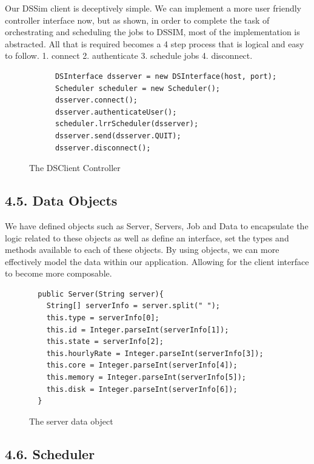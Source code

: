 \documentclass[a4paper]{article} %
\begin{document}
Our DSSim client is deceptively simple. We can implement a more user friendly controller interface now, but as shown, in order to complete the task of orchestrating and scheduling the jobs to DSSIM, most of the implementation is abstracted. All that is required becomes a 4 step process that is logical and easy to follow. 1. connect 2. authenticate 3. schedule jobs 4. disconnect.


\begin{figure}[ht!]
\begin{lstlisting}
      DSInterface dsserver = new DSInterface(host, port);
      Scheduler scheduler = new Scheduler();
      dsserver.connect();
      dsserver.authenticateUser();
      scheduler.lrrScheduler(dsserver);
      dsserver.send(dsserver.QUIT);
      dsserver.disconnect();
\end{lstlisting}
\caption{The DSClient Controller}
\end{figure}

\subsection*{4.5. Data Objects}

We have defined objects such as Server, Servers, Job and Data to encapsulate the logic related to these objects as well as define an interface, set the types and methods available to each of these objects. By using objects, we can more effectively model the data within our application. Allowing for the client interface to become more composable.

\begin{figure}[ht!]
\begin{lstlisting}
  public Server(String server){
    String[] serverInfo = server.split(" ");
    this.type = serverInfo[0];
    this.id = Integer.parseInt(serverInfo[1]);
    this.state = serverInfo[2];
    this.hourlyRate = Integer.parseInt(serverInfo[3]);
    this.core = Integer.parseInt(serverInfo[4]);
    this.memory = Integer.parseInt(serverInfo[5]);
    this.disk = Integer.parseInt(serverInfo[6]);
  }

\end{lstlisting}
\caption{The server data object}
\end{figure}

\subsection*{4.6. Scheduler}
\end{document}
